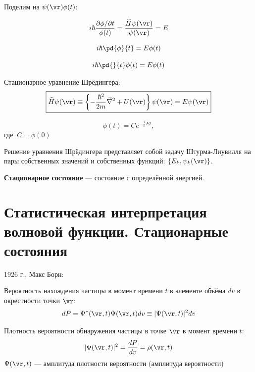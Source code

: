 Поделим на $\psi(\vr)\phi(t)$:

$$i \hbar \frac{\partial \phi / \partial t}{\phi(t)} = \frac{\widehat{H} \psi(\vr)}{\psi(\vr)} = E$$

\begin{equation}
\label{eq:1_3_4}
i \hbar \pd{\phi}{t} = E \phi(t)
\end{equation}

\begin{equation}
\label{eq:1_3_5}
i \hbar \pd{}{t} \phi(t) = E \phi(t)
\end{equation}

Стационарное уравнение Шрёдингера:
\begin{equation}
\label{eq:1_3_6}
\boxed{\widehat{H} \psi(\vr) \equiv \left\{ -\frac{\hbar^2}{2m} \vec{\nabla}^2 + U(\vr) \right\}\psi(\vr) = E\psi(\vr)}
\end{equation}

$$\phi(t)=C e^{-\frac{i}{\hbar}Et},$$
где $~C=\phi(0)$

Решение уравнения Шрёдингера представляет собой задачу Штурма-Лиувилля на пары собственных значений и собственных функций: $\{E_k, \psi_k(\vr)\}$.

\textbf{Стационарное состояние} --- состояние с определённой энергией.

\begin{sloppypar}
  \section{Статистическая интерпретация волновой функции. Стационарные состояния}
\end{sloppypar}

1926 г., Макс Борн: 

\begin{defn}
Вероятность нахождения частицы в момент времени $t$ в элементе объёма $dv$ в окрестности точки $\vr$:
\begin{equation}
\label{eq:1_4_1}
dP = \Psi^*(\vr,t) \Psi(\vr,t) dv \equiv|\Psi(\vr,t)|^2dv
\end{equation}
\end{defn}

\begin{defn}
Плотность вероятности обнаружения частицы в точке $\vr$ в момент времени $t$:
\begin{equation}
\label{eq:1_4_2}
|\Psi(\vr,t)|^2 = \frac{dP}{dv} = \rho(\vr,t)
\end{equation}
$\Psi(\vr,t)$ --- амплитуда плотности вероятности (амплитуда вероятности)
\end{defn}



